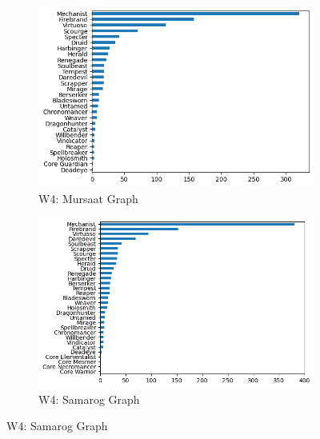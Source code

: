 \documentclass[12pt,a4paper]{article}
\begin{document}
\begin{figure}[h!]
        \begin{subfigure}{0.5\textwidth}
            \centering
            \includegraphics[scale=0.4]{mo_graph.png}
            \caption{\small W4: Mursaat Graph}
        \end{subfigure}%
        \begin{subfigure}{0.5\textwidth}
            \centering
            \includegraphics[scale=0.4]{sam_graph.png}
            \caption{\small W4: Samarog Graph}
        \end{subfigure}
    \end{figure}

    \newpage
\end{document}
